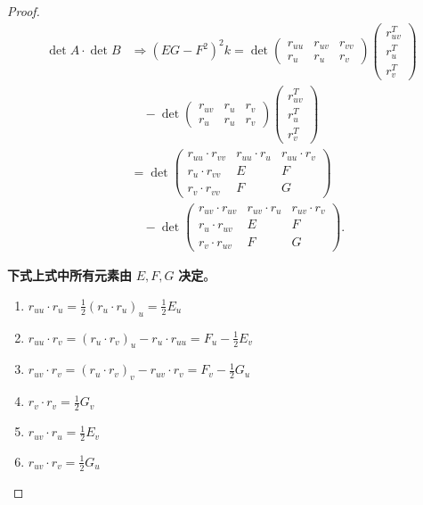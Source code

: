 \documentclass[lang=cn,10pt,thmcnt=section]{elegantbook}
\begin{document}
\begin{proof}
        \begin{align*}
            \det A \cdot \det B &\Rightarrow (E G - F^2)^2 k = \det \begin{pmatrix} r_{uu} & r_{uv} & r_{vv} \\ r_u & r_u & r_v \end{pmatrix} \begin{pmatrix} r_{uv}^T \\ r_u^T \\ r_v^T \end{pmatrix} \\
            &\quad - \det \begin{pmatrix} r_{uv} & r_{u} & r_{v} \\ r_u & r_u & r_v \end{pmatrix} \begin{pmatrix} r_{uv}^T \\ r_u^T \\ r_v^T \end{pmatrix} \\
            &= \det \begin{pmatrix} 
            r_{uu} \cdot r_{vv} & r_{uu} \cdot r_u & r_{uu} \cdot r_v \\ 
            r_u \cdot r_{vv} & E & F \\ 
            r_v \cdot r_{vv} & F & G 
            \end{pmatrix} \\
            &\quad - \det \begin{pmatrix} 
            r_{uv} \cdot r_{uv} & r_{uv} \cdot r_u & r_{uv} \cdot r_v \\ 
            r_u \cdot r_{uv} & E & F \\ 
            r_v \cdot r_{uv} & F & G 
            \end{pmatrix}.
        \end{align*}
    
        \textbf{下式上式中所有元素由} $E, F, G$ \textbf{决定}。
        
        \begin{enumerate}
            \item $r_{uu} \cdot r_{u} = \frac{1}{2} (r_{u} \cdot r_{u})_u = \frac{1}{2} E_u$
            \item $r_{uu} \cdot r_{v} = (r_{u} \cdot r_{v})_u - r_{u} \cdot r_{uu} = F_u - \frac{1}{2} E_v$
            \item $r_{uv} \cdot r_{v} = (r_{u} \cdot r_{v})_v - r_{uv} \cdot r_{v} = F_v - \frac{1}{2} G_u$
            \item $r_{v} \cdot r_{v} = \frac{1}{2} G_v$
            \item $r_{uv} \cdot r_{u} = \frac{1}{2} E_v$
            \item $r_{uv} \cdot r_{v} = \frac{1}{2} G_u$
        \end{enumerate}
        

\end{proof}
\end{document}

